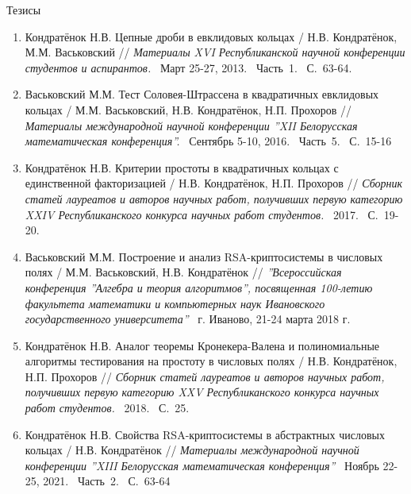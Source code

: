 \documentclass[8pt, xcolor=x11names]{beamer}
\begin{document}
\begin{frame}{Тезисы}
    \begin{small}
        \begin{enumerate}
            \item Кондратёнок Н.В. Цепные дроби в евклидовых кольцах / Н.В. Кондратёнок, М.М. Васьковский // {\it Материалы XVI Республиканской научной конференции студентов и аспирантов.} \textendash\ Март 25-27, 2013. \textendash\ Часть~1. \textendash\ С.~63-64.
            
            \item Васьковский М.М. Тест Соловея-Штрассена в квадратичных евклидовых кольцах / М.М. Васьковский, Н.В. Кондратёнок, Н.П. Прохоров // {\it Материалы международной научной конференции ''XII Белорусская математическая конференция''.} \textendash\ Сентябрь 5-10, 2016. \textendash\ Часть~5. \textendash\ С.~15-16
            
            \item Кондратёнок Н.В. Критерии простоты в квадратичных кольцах с единственной факторизацией / Н.В. Кондратёнок, Н.П. Прохоров // {\it Сборник статей лауреатов и авторов научных работ, получивших первую категорию XXIV Республиканского конкурса научных работ студентов.} \textendash\ 2017. \textendash\ С.~19-20.
            
            \item Васьковский М.М. Построение и анализ RSA-криптосистемы в числовых полях / М.М. Васьковский, Н.В. Кондратёнок // {\it ''Всероссийская конференция ''Алгебра и теория алгоритмов'', посвященная 100-летию факультета математики и компьютерных наук Ивановского государственного университета''} \textendash\ г. Иваново, 21-24 марта 2018 г.
            
            \item Кондратёнок Н.В. Аналог теоремы Кронекера-Валена и полиномиальные алгоритмы тестирования на простоту в числовых полях / Н.В. Кондратёнок, Н.П. Прохоров // {\it Сборник статей лауреатов и авторов научных работ, получивших первую категорию XXV Республиканского конкурса научных работ студентов.} \textendash\ 2018. \textendash\ С.~25.
    
            \item Кондратёнок Н.В. Свойства RSA-криптосистемы в абстрактных числовых кольцах / Н.В. Кондратёнок // {\it Материалы международной научной конференции ''XIII Белорусская математическая конференция''} \textendash\ Ноябрь 22-25, 2021. \textendash\ Часть~2. \textendash\ С.~63-64
        \end{enumerate}
    \end{small}
\end{frame}
\end{document}

